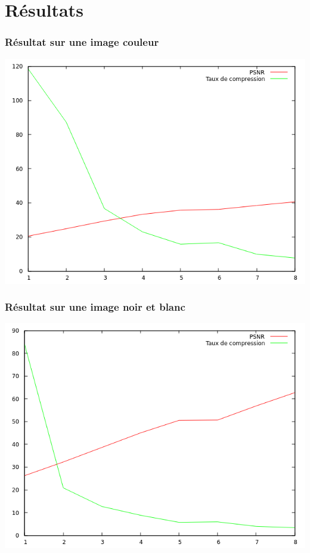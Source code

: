 \documentclass{beamer}
\begin{document}
\section{Résultats}
\begin{frame}
  \frametitle{Résultat sur une image couleur}
  \begin{center}
    \includegraphics[scale=0.4]{her_graph.png}
  \end{center}
\end{frame}
\begin{frame}
  \frametitle{Résultat sur une image noir et blanc}
  \begin{center}
    \includegraphics[scale=0.4]{bnw_graph.png}
  \end{center}
\end{frame}
\end{document}
